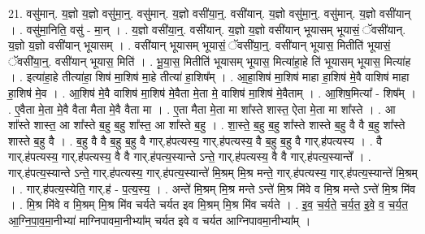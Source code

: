 \documentclass[17pt]{extarticle}
\begin{document}
21. वसु॑मान्. य॒ज्ञो य॒ज्ञो वसु॑मा॒न्॒. वसु॑मान्. य॒ज्ञो वसी॑या॒न्॒. वसी॑यान्. य॒ज्ञो वसु॑मा॒न्॒. वसु॑मान्. य॒ज्ञो वसी॑यान् । . वसु॑मा॒निति॒ वसु॑ - मा॒न् । . य॒ज्ञो वसी॑या॒न्॒. वसी॑यान्. य॒ज्ञो य॒ज्ञो वसी॑यान् भूयासम् भूयासं॒ ॅवसी॑यान्. य॒ज्ञो य॒ज्ञो वसी॑यान् भूयासम् । . वसी॑यान् भूयासम् भूयासं॒ ॅवसी॑या॒न्॒. वसी॑यान् भूयास॒ मितीति॑ भूयासं॒ ॅवसी॑या॒न्॒. वसी॑यान् भूयास॒ मिति॑ । . भू॒या॒स॒ मितीति॑ भूयासम् भूयास॒ मित्या॑हा॒हे ति॑ भूयासम् भूयास॒ मित्या॑ह । . इत्या॑हा॒हे तीत्या॑हा॒ शिष॑ मा॒शिष॑ मा॒हे तीत्या॑ हा॒शिष᳚म् । . आ॒हा॒शिष॑ मा॒शिष॑ माहा हा॒शिष॑ मे॒वै वाशिष॑ माहा हा॒शिष॑ मे॒व । . आ॒शिष॑ मे॒वै वाशिष॑ मा॒शिष॑ मे॒वैता मे॒ता मे॒ वाशिष॑ मा॒शिष॑ मे॒वैताम् । . आ॒शिष॒मित्या᳚ - शिष᳚म् । . ए॒वैता मे॒ता मे॒वै वैता मैता मे॒वै वैता मा । . ए॒ता मैता मे॒ता मा शा᳚स्ते शास्त॒ ऐता मे॒ता मा शा᳚स्ते । . आ शा᳚स्ते शास्त॒ आ शा᳚स्ते ब॒हु ब॒हु शा᳚स्त॒ आ शा᳚स्ते ब॒हु । . शा॒स्ते॒ ब॒हु ब॒हु शा᳚स्ते शास्ते ब॒हु वै वै ब॒हु शा᳚स्ते शास्ते ब॒हु वै । . ब॒हु वै वै ब॒हु ब॒हु वै गार्.ह॑पत्यस्य॒ गार्.ह॑पत्यस्य॒ वै ब॒हु ब॒हु वै गार्.ह॑पत्यस्य । . वै गार्.ह॑पत्यस्य॒ गार्.ह॑पत्यस्य॒ वै वै गार्.ह॑पत्य॒स्यान्ते ऽन्ते॒ गार्.ह॑पत्यस्य॒ वै वै गार्.ह॑पत्य॒स्यान्ते᳚ । . गार्.ह॑पत्य॒स्यान्ते ऽन्ते॒ गार्.ह॑पत्यस्य॒ गार्.ह॑पत्य॒स्यान्ते॑ मि॒श्रम् मि॒श्र मन्ते॒ गार्.ह॑पत्यस्य॒ गार्.ह॑पत्य॒स्यान्ते॑ मि॒श्रम् । . गार्.ह॑पत्य॒स्येति॒ गार्.ह॑ - प॒त्य॒स्य॒ । . अन्ते॑ मि॒श्रम् मि॒श्र मन्ते ऽन्ते॑ मि॒श्र मि॑वे व मि॒श्र मन्ते ऽन्ते॑ मि॒श्र मि॑व । . मि॒श्र मि॑वे व मि॒श्रम् मि॒श्र मि॑व चर्यते चर्यत इव मि॒श्रम् मि॒श्र मि॑व चर्यते । . इ॒व॒ च॒र्य॒ते॒ च॒र्य॒त॒ इ॒वे॒ व॒ च॒र्य॒त॒ आ॒ग्नि॒पा॒व॒मा॒नीभ्या॑ माग्निपावमा॒नीभ्या᳚म् चर्यत इवे व चर्यत आग्निपावमा॒नीभ्या᳚म् । \newline
\end{document}
